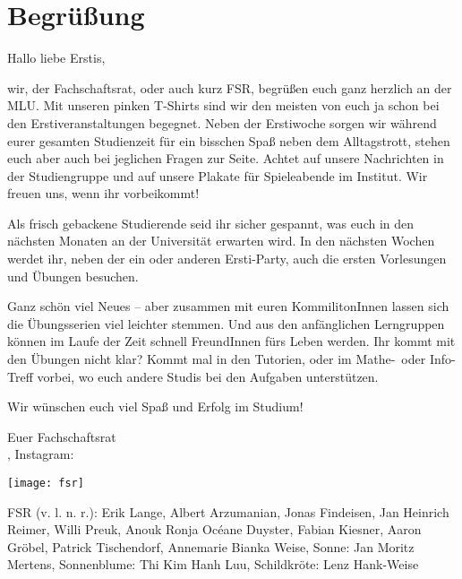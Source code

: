 \section{Begrüßung}

\begin{spacing}{1.4}
    \setlength{\parskip}{1.3ex}

    Hallo liebe Erstis,

    wir, der Fachschaftsrat, oder auch kurz FSR, 
    begrüßen euch ganz herzlich an der MLU.
    Mit unseren pinken T-Shirts sind wir den meisten 
    von euch ja schon bei den Erstiveranstaltungen begegnet.
    Neben der Erstiwoche sorgen wir während eurer gesamten Studienzeit
    für ein bisschen Spaß neben dem Alltagstrott, 
    stehen euch aber auch bei jeglichen Fragen zur Seite.
    Achtet auf unsere Nachrichten in der Studiengruppe und auf unsere Plakate für Spieleabende im Institut.
    Wir freuen uns, wenn ihr vorbeikommt!

    Als frisch gebackene Studierende seid ihr sicher gespannt, 
    was euch in den nächsten Monaten 
    an der Universität erwarten wird. 
    In den nächsten Wochen werdet ihr, 
    neben der ein oder anderen Ersti-Party,
    auch die ersten Vorlesungen und Übungen besuchen.

    Ganz schön viel Neues -- 
    aber zusammen mit euren KommilitonInnen 
    lassen sich die Übungsserien viel leichter stemmen.
    Und aus den anfänglichen Lerngruppen 
    können im Laufe der Zeit schnell FreundInnen fürs Leben werden.
    Ihr kommt mit den Übungen nicht klar? 
    Kommt mal in den Tutorien, 
    oder im Mathe-~oder Info-Treff vorbei, 
    wo euch andere Studis bei den Aufgaben unterstützen.

    Wir wünschen euch viel Spaß und Erfolg im Studium!

    Euer Fachschaftsrat \\
    ,
    Instagram: 
\end{spacing}
\vspace*{-1ex}
\begin{center}
    \texttt{[image: fsr]}
\end{center}%
FSR (v. l. n. r.): 
Erik Lange, Albert Arzumanian, Jonas Findeisen, Jan Heinrich Reimer, Willi Preuk, Anouk Ronja Océane Duyster, Fabian Kiesner, Aaron Gröbel, Patrick Tischendorf, Annemarie Bianka Weise, Sonne: Jan Moritz Mertens, Sonnenblume: Thi Kim Hanh Luu, Schildkröte: Lenz Hank-Weise 

